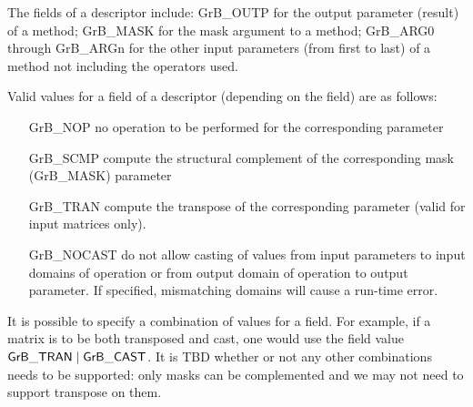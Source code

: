 The fields of a descriptor include: {\sf GrB\_OUTP} for the output parameter 
(result) of a method; {\sf GrB\_MASK} for the mask argument to a method; 
{\sf GrB\_ARG0} through {\sf GrB\_ARGn} for the other input parameters 
(from first to last) of a method not including the operators used.


Valid values for a field of a descriptor (depending on the field) are as follows:

\begin{itemize}[leftmargin=1.5in]
\item[{\sf GrB\_NOP}]    no operation to be performed for the corresponding parameter
\item[{\sf GrB\_SCMP}]   compute the structural complement of the corresponding mask
                         (GrB\_MASK) parameter
\item[{\sf GrB\_TRAN}]   compute the transpose of the corresponding parameter (valid
                         for input matrices only).
\item[{\sf GrB\_NOCAST}] do not allow casting of values from input parameters to input domains 
                         of operation or from output domain of operation to output 
                         parameter. If specified, mismatching domains will cause a 
                         run-time error.
\end{itemize}

It is possible to specify a combination of values for a field. For 
example, if a matrix is to be both transposed and cast, one would use the field value
${\sf GrB\_TRAN} \mid {\sf GrB\_CAST}$.  It is TBD whether or not any other combinations
needs to be supported: only masks can be complemented and we may not need to support
transpose on them.

